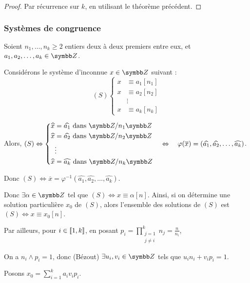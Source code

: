 \begin{proof}
    Par récurrence sur $k$, en utilisant le théorème précédent.
\end{proof}

\subsubsection{Systèmes de congruence }

Soient $n_1, \ldots, n_k \geqslant 2$ entiers deux à deux premiers entre eux, et 
$a_1, a_2, \ldots, a_k \in \Z$.

Considérons le système d'inconnue $x \in \Z$ suivant :
\[
    (S) \left\{ 
        \begin{aligned}
            x & \equiv a_1 [n_1] \\
            x & \equiv a_2 [n_2] \\
            & \vdots \\
            x & \equiv a_k [n_k]
        \end{aligned}
    \right.
\] 

Alors, $(S) \Leftrightarrow \left\{ 
    \begin{aligned}
        \widehat x & = \widehat{a_1} \text{ dans } \Z / n_1 \Z \\
        \widehat x & = \widehat{a_2} \text{ dans } \Z / n_2 \Z \\
        & \vdots \\
        \widehat x & = \widehat{a_k} \text{ dans } \Z / n_k \Z
    \end{aligned} \right. \quad \Leftrightarrow  \quad\varphi(\overline x) = (\widehat{a_1}, \widehat{a_2}, \ldots, \widehat{a_k})$.

Donc $(S) \Leftrightarrow \overline x = \varphi^{-1}(\widehat{a_1}, \widehat{a_2}, \ldots, \widehat{a_k})$.

Donc $\exists \alpha \in \Z$ tel que $(S) \Leftrightarrow x \equiv \alpha [n]$. Ainsi, si on détermine 
une solution particulière $x_0$ de $(S)$, alors l'ensemble des solutions de $(S)$ est 
$(S) \Leftrightarrow x \equiv x_0 [n]$.

Par ailleurs, pour $i \in [\![1, k]\!]$, en posant $\displaystyle p_i = \prod_{\substack{j = 1 \\ j \neq i}}^k n_j = \frac n {n_i}$,

On a $n_i \wedge p_i = 1$, donc (Bézout) $\exists u_i, v_i \in \Z$ tels que $u_i n_i + v_i p_i = 1$.

Posons $x_0 = \displaystyle \sum_{i = 1}^k a_i v_i p_i$.

